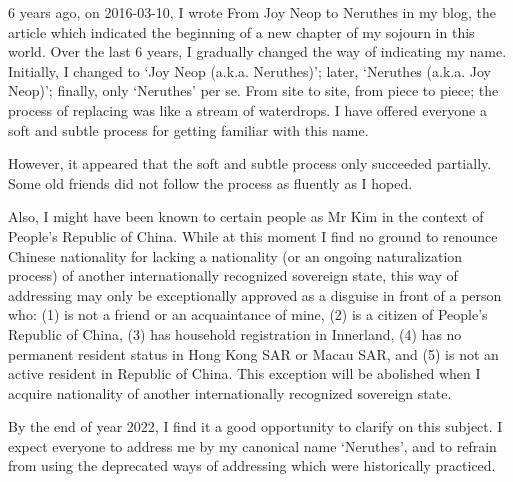 
6 years ago, on 2016-03-10, I wrote \textsf{From Joy Neop to Neruthes} in my blog,
the article which indicated the beginning of a new chapter of my sojourn in this world.
Over the last 6 years, I gradually changed the way of indicating my name.
Initially, I changed to `Joy Neop (a.k.a. Neruthes)'; later, `Neruthes (a.k.a. Joy Neop)';
finally, only `Neruthes' per se.
From site to site, from piece to piece;
the process of replacing was like a stream of waterdrops.
I have offered everyone a soft and subtle process for getting familiar with this name.

However, it appeared that the soft and subtle process only succeeded partially.
Some old friends did not follow the process as fluently as I hoped.

Also, I might have been known to certain people as Mr Kim in the context of People's Republic of China.
While at this moment I find no ground to renounce Chinese nationality for lacking a nationality (or an ongoing naturalization process)
of another internationally recognized sovereign state,
this way of addressing may only be exceptionally approved as a disguise in front of a person who:
(1) is not a friend or an acquaintance of mine,
(2) is a citizen of People's Republic of China,
(3) has household registration in Innerland,
(4) has no permanent resident status in Hong Kong SAR or Macau SAR, and
(5) is not an active resident in Republic of China.
This exception will be abolished when I acquire nationality of another internationally recognized sovereign state.

By the end of year 2022, I find it a good opportunity to clarify on this subject.
I expect everyone to address me by my canonical name `Neruthes',
and to refrain from using the deprecated ways of addressing which were historically practiced.
